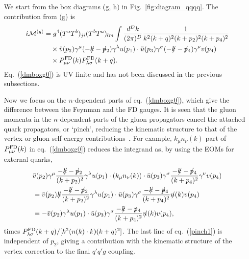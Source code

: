 \documentclass[preprint,amsmath,amssymb,superscriptaddress, floatfix,nofootinbib]{revtex4}
\def\psla{p\kern-.45em/}
\def\ksla{k\kern-.45em/}
\def\nsla{n\kern-.45em/}
\begin{document}

We start from the box diagrams (g, h) in Fig.~\ref{fig:diagram_qqqq}. 
The contribution from (g) is 
%
\begin{align}
i{\cal M}^{(g)} & = 
g^4(T^aT^b)_{ji} (T^bT^a)_{lm} \int \frac{d^D k}{(2\pi)^D}
\frac{1}{k^2(k+q)^2(k+p_2)^2(k+p_4)^2}
\nonumber \\
&\quad \times \bar{v}(p_2)\gamma^{\mu}(-\ksla-\psla_2)\gamma^{\lambda}u(p_1)
\cdot \bar{u}(p_3)\gamma^{\sigma}(-\ksla-\psla_4)\gamma^{\nu}v(p_4) 
\nonumber \\
&\quad \times P^{\rm FD}_{\mu\nu}(k) P^{\rm FD}_{\lambda\sigma}(k+q) . 
\label{dmboxg0}
\end{align}
%
Eq.~(\ref{dmboxg0}) is UV finite and has not been discussed in the previous subsections. 

Now we focus on the $n$-dependent parts of eq.~(\ref{dmboxg0}), which give 
the difference between the Feynman and the FD gauges. 
It is seen that the gluon momenta in the $n$-dependent parts of 
the gluon propagators cancel the attached quark propagators, 
or `pinch', 
reducing the kinematic structure to that of the vertex or 
gluon self energy contributions~\cite{Cornwall:1989gv,Binosi:2009qm}. 
For example, $k_{\mu}n_{\nu}(k)$ part of 
$P^{\rm FD}_{\mu\nu}(k)$ in eq.~(\ref{dmboxg0}) reduces the integrand as, 
by using the EOMs for external quarks, 
%
\begin{align}
& \bar{v}(p_2)\gamma^{\mu} \frac{ -\ksla-\psla_2 }{(k+p_2)^2}\gamma^{\lambda}u(p_1)
\cdot (k_{\mu}n_{\nu}(k))
\cdot \bar{u}(p_3)\gamma^{\sigma}
\frac{ -\ksla-\psla_4 }{(k+p_4)^2} \gamma^{\nu}v(p_4)
\nonumber \\
& = 
 \bar{v}(p_2) \ksla \frac{ -\ksla-\psla_2 }{(k+p_2)^2}
\gamma^{\lambda}u(p_1)\cdot \bar{u}(p_3)\gamma^{\sigma}
\frac{ -\ksla-\psla_4 }{(k+p_4)^2} \nsla(k) v(p_4)
\nonumber \\
& =  
- \bar{v}(p_2) \gamma^{\lambda}u(p_1)\cdot \bar{u}(p_3)\gamma^{\sigma}
\frac{ -\ksla-\psla_4 }{(k+p_4)^2} \nsla(k) v(p_4) ,
\label{pinch1}
\end{align}
%
times $P^{\rm FD}_{\lambda\sigma}(k+q)/[k^2(n(k)\cdot k)(k+q)^2]$. 
The last line of eq.~(\ref{pinch1}) is independent of $p_2$, 
giving a contribution with the kinematic structure of the vertex correction to the 
final ${q}'q'g$ coupling. 
\end{document}
